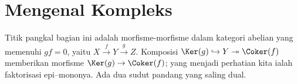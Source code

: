 
\section{Mengenal Kompleks}\label{sec:cohomology}
\hypertarget{o014.aljabr2.chapter2.first-look-at-complexes}{ }

Titik pangkal bagian ini adalah morfisme-morfisme dalam kategori abelian yang
memenuhi $gf = 0$, yaitu
$X \xrightarrow{f} Y \xrightarrow{g} Z$. Komposisi
$\Ker(g) \hookrightarrow Y \twoheadrightarrow \Coker(f)$ memberikan morfisme
$\Ker(g) \to \Coker(f)$; yang menjadi perhatian kita ialah faktorisasi
epi--mononya. Ada dua sudut pandang yang saling dual.

